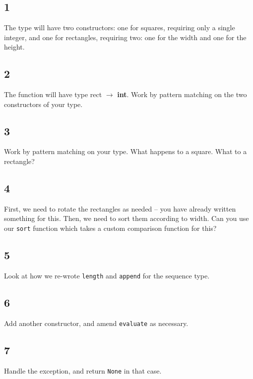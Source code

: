 \documentclass[]{book}
\begin{document}
\begin{multicols*}{2}
\section*{\\ }
\subsection*{1}
The type will have two constructors: one for squares, requiring only a single integer, and one for rectangles, requiring two: one for the width and one for the height.

\subsection*{2}
The function will have type \textsf{rect $\rightarrow$ \textbf{int}}. Work by pattern matching on the two constructors of your type.

\subsection*{3}
Work by pattern matching on your type. What happens to a square. What to a rectangle?

\subsection*{4}
First, we need to rotate the rectangles as needed -- you have already written something for this. Then, we need to sort them according to width. Can you use our \texttt{sort} function which takes a custom comparison function for this?

\subsection*{5}
Look at how we re-wrote \texttt{length} and \texttt{append} for the \textsf{sequence} type.

\subsection*{6}
Add another constructor, and amend \texttt{evaluate} as necessary.

\subsection*{7}
Handle the exception, and return \texttt{None} in that case.


\end{multicols*}
\end{document}
